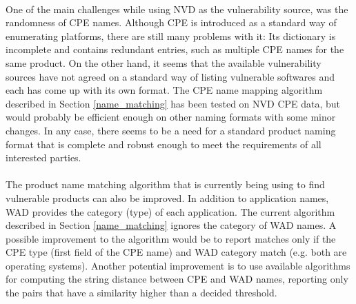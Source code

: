 \paragraph{}
One of the main challenges while using NVD as the vulnerability source, was the randomness of CPE names. Although CPE is introduced as a standard way of enumerating platforms, there are still many problems with it: Its dictionary is incomplete and contains redundant entries, such as multiple CPE names for the same product. On the other hand, it seems that the available vulnerability sources have not agreed on a standard way of listing vulnerable softwares and each has come up with its own format. The CPE name mapping algorithm described in Section \ref{name_matching} has been tested on NVD CPE data, but would probably be efficient enough on other naming formats with some minor changes. In any case, there seems to be a need for a standard product naming format that is complete and robust enough to meet the requirements of all interested parties. 

\paragraph{}
The product name matching algorithm that is currently being using to find vulnerable products can also be improved. In addition to application names, WAD provides the category (type) of each application. The current algorithm described in Section \ref{name_matching} ignores the category of WAD names. A possible improvement to the algorithm would be to report matches only if the CPE type (first field of the CPE name) and WAD category match (e.g. both are operating systems). Another potential improvement is to use available algorithms for computing the string distance between CPE and WAD names, reporting only the pairs that have a similarity higher than a decided threshold.  
